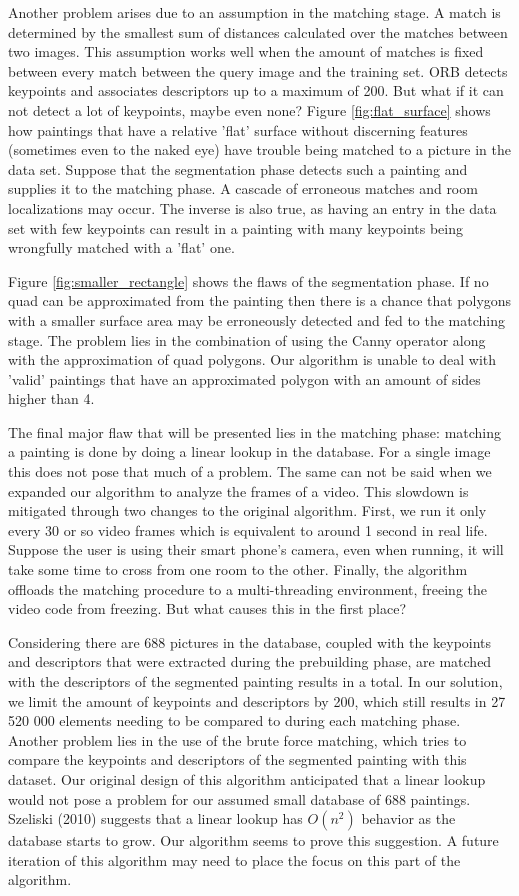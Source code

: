 Another problem arises due to an assumption in the matching stage. A match is determined by the smallest sum of distances calculated over the matches between two images. This assumption works well when the amount of matches is fixed between every match between the query image and the training set. ORB detects keypoints and associates descriptors up to a maximum of 200. But what if it can not detect a lot of keypoints, maybe even none? Figure \ref{fig:flat_surface} shows how paintings that have a relative 'flat' surface without discerning features (sometimes even to the naked eye) have trouble being matched to a picture in the data set. Suppose that the segmentation phase detects such a painting and supplies it to the matching phase. A cascade of erroneous matches and room localizations may occur. The inverse is also true, as having an entry in the data set with few keypoints can result in a painting with many keypoints being wrongfully matched with a 'flat' one.


Figure \ref{fig:smaller_rectangle} shows the flaws of the segmentation phase. If no quad can be approximated from the painting then there is a chance that polygons with a smaller surface area may be erroneously detected and fed to the matching stage. The problem lies in the combination of using the Canny operator along with the approximation of quad polygons. Our algorithm is unable to deal with 'valid' paintings that have an approximated polygon with an amount of sides higher than 4.


The final major flaw that will be presented lies in the matching phase: matching a painting is done by doing a linear lookup in the database. For a single image this does not pose that much of a problem. The same can not be said when we expanded our algorithm to analyze the frames of a video. This slowdown is mitigated through two changes to the original algorithm. First, we run it only every 30 or so video frames which is equivalent to around 1 second in real life. Suppose the user is using their smart phone's camera, even when running, it will take some time to cross from one room to the other. Finally, the algorithm offloads the matching procedure to a multi-threading environment, freeing the video code from freezing. But what causes this in the first place? 


Considering there are 688 pictures in the database, coupled with the keypoints and descriptors that were extracted during the prebuilding phase, are matched with the descriptors of the segmented painting results in a total. In our solution, we limit the amount of keypoints and descriptors by 200, which still results in 27 520 000 elements needing to be compared to during each matching phase. Another problem lies in the use of the brute force matching, which tries to compare the keypoints and descriptors of the segmented painting with this dataset. Our original design of this algorithm anticipated that a linear lookup would not pose a problem for our assumed small database of 688 paintings. Szeliski (2010)  suggests that a linear lookup has $O(n^{2})$ behavior as the database starts to grow. Our algorithm seems to prove this suggestion. A future iteration of this algorithm may need to place the focus on this part of the algorithm.


